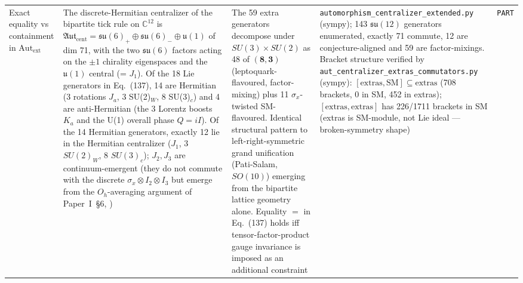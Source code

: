 {\begin{longtable}{@{}p{3.2cm}p{3.6cm}p{3.4cm}p{3.8cm}p{1.0cm}@{}}
\hline
Exact equality vs containment in $\mathrm{Aut}_\text{ext}$
    & The discrete-Hermitian centralizer of the bipartite tick
      rule on $\mathbb{C}^{12}$ is $\mathfrak{Aut}_\text{cent} =
      \mathfrak{su}(6)_+ \oplus \mathfrak{su}(6)_- \oplus
      \mathfrak{u}(1)$ of dim 71, with the two $\mathfrak{su}(6)$
      factors acting on the $\pm 1$ chirality eigenspaces and the
      $\mathfrak{u}(1)$ central (= $J_1$).  Of the 18 Lie
      generators in Eq.~(137), 14 are Hermitian (3 rotations $J_a$,
      3 SU(2)$_W$, 8 SU(3)$_c$) and 4 are anti-Hermitian (the 3
      Lorentz boosts $K_a$ and the U(1) overall phase $Q = iI$).
      Of the 14 Hermitian generators, exactly 12 lie in the
      Hermitian centralizer ($J_1$, 3 $SU(2)_W$, 8 $SU(3)_c$);
      $J_2, J_3$ are continuum-emergent (they do not commute with
      the discrete $\sigma_x \otimes I_2 \otimes I_3$ but emerge
      from the $O_h$-averaging argument of Paper~I~§6,
      \cite{menendez2026geometry})
    & The 59 extra generators decompose under
      $SU(3) \times SU(2)$ as 48 of $(\mathbf{8}, \mathbf{3})$
      (leptoquark-flavoured, factor-mixing) plus 11
      $\sigma_x$-twisted SM-flavoured.  Identical structural
      pattern to left-right-symmetric grand unification (Pati-Salam,
      $SO(10)$) emerging from the bipartite lattice
      geometry alone.  Equality $=$ in Eq.~(137) holds iff
      tensor-factor-product gauge invariance is imposed as an
      additional constraint
    & \nolinkurl{automorphism_centralizer_extended.py} (sympy);
      143 $\mathfrak{su}(12)$ generators enumerated, exactly 71
      commute, 12 are conjecture-aligned and 59 are factor-mixings.
      Bracket structure verified by
      \nolinkurl{aut_centralizer_extras_commutators.py} (sympy):
      $[\text{extras}, \text{SM}] \subseteq \text{extras}$
      (708 brackets, 0 in SM, 452 in extras);
      $[\text{extras}, \text{extras}]$ has 226/1711 brackets in SM
      (extras is SM-module, not Lie ideal --- broken-symmetry shape)
    & \texttt{PART} \\


\end{longtable}}
